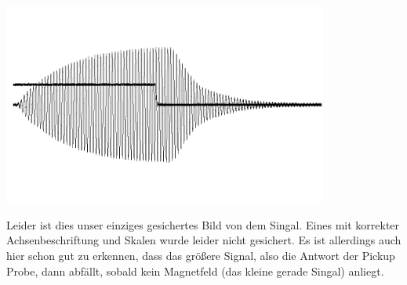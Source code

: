 \documentclass[10pt]{article}
\newenvironment{Figure}
  {\par\medskip\noindent\minipage{\linewidth}}
  {\endminipage\par\medskip}
\begin{document}
\begin{multicols}{2}
\begin{Figure}
		\centering\includegraphics[width=0.8\textwidth]{scope_0.png}
		\label{fig:PP}
	\end{Figure}
Leider ist dies unser einziges gesichertes Bild von dem Singal. Eines mit korrekter Achsenbeschriftung und Skalen wurde leider nicht gesichert. Es ist allerdings auch hier schon gut zu erkennen, dass das größere Signal, also die Antwort der Pickup Probe, dann abfällt, sobald kein Magnetfeld (das kleine gerade Singal) anliegt.


\end{multicols}
\end{document}
